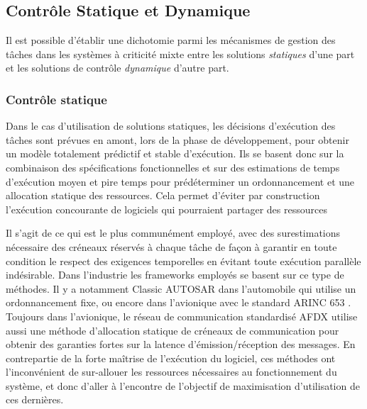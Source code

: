 \documentclass[french, a4paper, 11pt, twoside, pdftex]{StyleThese}
\begin{document}
	\subsection{Contrôle Statique et Dynamique}
	Il est possible d'établir une dichotomie parmi les mécanismes de gestion des tâches dans les systèmes à criticité mixte entre les solutions \textit{statiques} d'une part et les solutions de contrôle \textit{dynamique} d'autre part. 
	
	\subsubsection{Contrôle statique}
	Dans le cas d'utilisation de solutions statiques, les décisions d'exécution des tâches sont prévues en amont, lors de la phase de développement, pour obtenir un modèle totalement prédictif et stable d'exécution. Ils se basent donc sur la combinaison des spécifications fonctionnelles et sur des estimations de temps d'exécution moyen et pire temps pour prédéterminer un ordonnancement et une allocation statique des ressources. Cela permet d'éviter par construction l'exécution concourante de logiciels qui pourraient partager des ressources
	
	Il s'agit de ce qui est le plus communément employé, avec des surestimations nécessaire des créneaux réservés à chaque tâche de façon à garantir en toute condition le respect des exigences temporelles en évitant toute exécution parallèle indésirable. Dans l'industrie les frameworks employés se basent sur ce type de méthodes. Il y a notamment Classic AUTOSAR \cite{autosar_timing_2016} dans l'automobile qui utilise un ordonnancement fixe, ou encore dans l'avionique avec le standard ARINC 653 \cite{prisaznuk_arinc_2008}. Toujours dans l'avionique, le réseau de communication standardisé AFDX \cite{charara_methods_2006} utilise aussi une méthode d'allocation statique de créneaux de communication pour obtenir des garanties fortes sur la latence d'émission/réception des messages. En contrepartie de la forte maîtrise de l'exécution du logiciel, ces méthodes ont l'inconvénient de sur-allouer les ressources nécessaires au fonctionnement du système, et donc d'aller à l'encontre de l'objectif de maximisation d'utilisation de ces dernières.
	
\end{document}
